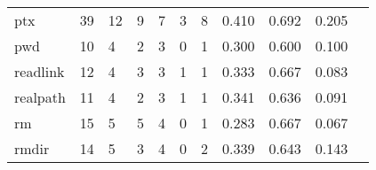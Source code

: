 \begin{longtable}{lp{1.20cm}p{1.20cm}p{1.20cm}p{1.20cm}p{1.20cm}p{1.20cm}p{1.20cm}p{1.20cm}p{1.20cm}p{1.20cm}}
ptx       &                                    39 &                                                 12 &                                                  9 &                                                  7 &                                                  3 &                                                  8 &                                         0.410 &                                              0.692 &                                              0.205 \\
pwd       &                                    10 &                                                  4 &                                                  2 &                                                  3 &                                                  0 &                                                  1 &                                         0.300 &                                              0.600 &                                              0.100 \\
readlink  &                                    12 &                                                  4 &                                                  3 &                                                  3 &                                                  1 &                                                  1 &                                         0.333 &                                              0.667 &                                              0.083 \\
realpath  &                                    11 &                                                  4 &                                                  2 &                                                  3 &                                                  1 &                                                  1 &                                         0.341 &                                              0.636 &                                              0.091 \\
rm        &                                    15 &                                                  5 &                                                  5 &                                                  4 &                                                  0 &                                                  1 &                                         0.283 &                                              0.667 &                                              0.067 \\
rmdir     &                                    14 &                                                  5 &                                                  3 &                                                  4 &                                                  0 &                                                  2 &                                         0.339 &                                              0.643 &                                              0.143 \\

\end{longtable}
